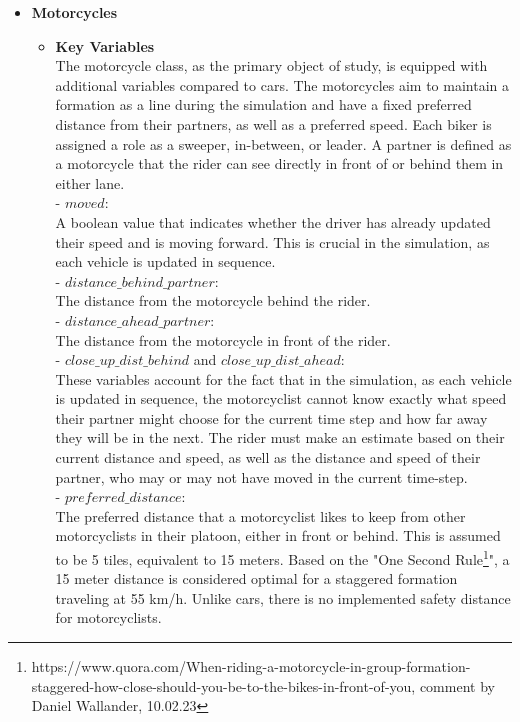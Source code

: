 \begin{itemize}
     \item \textbf{Motorcycles}
     \begin{itemize}
         \item \textbf{Key Variables}\\
          The motorcycle class, as the primary object of study, is equipped with additional variables compared to cars. The motorcycles aim to maintain a formation as a line during the simulation and have a fixed preferred distance from their partners, as well as a preferred speed. Each biker is assigned a role as a sweeper, in-between, or leader. A partner is defined as a motorcycle that the rider can see directly in front of or behind them in either lane. \\
          - $moved$:\\
          A boolean value that indicates whether the driver has already updated their speed and is moving forward. This is crucial in the simulation, as each vehicle is updated in sequence.\\
          - $distance\_behind\_partner$:\\
          The distance from the motorcycle behind the rider. \\
          - $distance\_ahead\_partner$:\\
          The distance from the motorcycle in front of the rider. \\
          - $close\_up\_dist\_behind$ and $close\_up\_dist\_ahead$:\\
          These variables account for the fact that in the simulation, as each vehicle is updated in sequence, the motorcyclist cannot know exactly what speed their partner might choose for the current time step and how far away they will be in the next. The rider must make an estimate based on their current distance and speed, as well as the distance and speed of their partner, who may or may not have moved in the current time-step.\\
          - $preferred\_distance$:\\
          The preferred distance that a motorcyclist likes to keep from other motorcyclists in their platoon, either in front or behind. This is assumed to be 5 tiles, equivalent to 15 meters. Based on the "One Second Rule\footnote{https://www.quora.com/When-riding-a-motorcycle-in-group-formation-staggered-how-close-should-you-be-to-the-bikes-in-front-of-you, comment by Daniel Wallander, 10.02.23}", a 15 meter distance is considered optimal for a staggered formation traveling at 55 km/h. Unlike cars, there is no implemented safety distance for motorcyclists.\\

\end{itemize}
\end{itemize}
